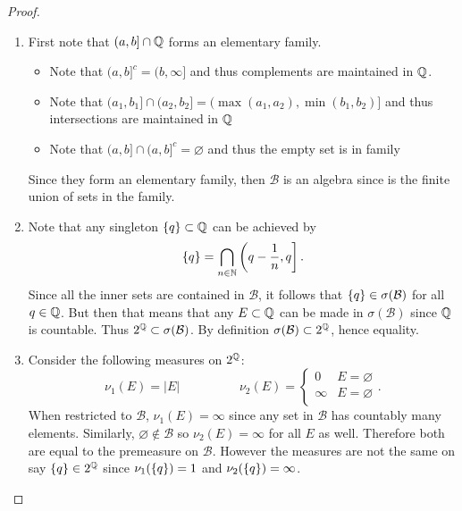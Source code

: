 \documentclass[hw_all.tex]{subfiles}
\begin{document}
\begin{proof}
    \begin{enumerate}
        \item
            First note that $(a,b] \cap \mathbb{Q}$ forms an elementary family.
            \begin{itemize}
                \item[iii)]
                    Note that $(a,b]^c = (b, \infty]$ and thus complements are maintained in $\mathbb{Q}$.

                \item[ii)]
                    Note that $(a_1, b_1] \cap (a_2, b_2] = (\max(a_1, a_2), \min(b_1, b_2)]$ and thus intersections are maintained in $\mathbb{Q}$

                \item[i)]
                    Note that $(a, b] \cap (a, b]^c = \varnothing$ and thus the empty set is in family
            \end{itemize}
            Since they form an elementary family, then $\mathcal{B}$ is an algebra since is the finite union of sets in the family.

        \item 
            Note that any singleton $\qty{q} \subset \mathbb{Q}$ can be achieved by
            \[
                \qty{q} = \bigcap_{n \in \mathbb{N}} \left(q-\frac{1}{n}, q\right]
            .\]
            Since all the inner sets are contained in $\mathcal{B}$, it follows that $\qty{q} \in \sigma(\mathcal{B})$ for all $q \in \mathbb{Q}$. But then that means that any $E \subset \mathbb{Q}$ can be made in $\sigma(\mathcal{B})$ since $\mathbb{Q}$ is countable. Thus $2^{\mathbb{Q}} \subset \sigma(\mathcal{B})$. By definition $\sigma(\mathcal{B}) \subset 2^{\mathbb{Q}}$, hence equality.

        \item 
            Consider the following measures on $2^{\mathbb{Q}}$:
            \[
                \nu_1(E) = |E| \hspace{2cm} \nu_2(E) = \begin{cases}
                    0 & E = \varnothing \\
                    \infty & E = \varnothing \\
                \end{cases}
            .\]
            When restricted to $\mathcal{B}$, $\nu_1(E) = \infty$ since any set in $\mathcal{B}$ has countably many elements. Similarly, $\varnothing \notin \mathcal{B}$ so $\nu_2(E) = \infty$ for all $E$ as well. Therefore both are equal to the premeasure on $\mathcal{B}$. However the measures are not the same on say $\qty{q} \in 2^{\mathbb{Q}}$ since $\nu_1(\qty{q}) = 1$ and $\nu_2(\qty{q}) = \infty$.
    \end{enumerate}
\end{proof}
\end{document}
